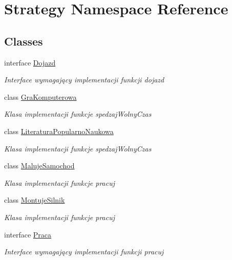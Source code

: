 \hypertarget{namespace_strategy}{}\section{Strategy Namespace Reference}
\label{namespace_strategy}
\subsection*{Classes}
\begin{DoxyCompactItemize}
\item 
interface \hyperlink{interface_strategy_1_1_dojazd}{Dojazd}
\begin{DoxyCompactList}\small\item\em Interface wymagający implementacji funkcji dojazd \end{DoxyCompactList}\item 
class \hyperlink{class_strategy_1_1_gra_komputerowa}{Gra\+Komputerowa}
\begin{DoxyCompactList}\small\item\em Klasa implementacji funkcje spedzaj\+Wolny\+Czas \end{DoxyCompactList}\item 
class \hyperlink{class_strategy_1_1_literatura_popularno_naukowa}{Literatura\+Popularno\+Naukowa}
\begin{DoxyCompactList}\small\item\em Klasa implementacji funkcje spedzaj\+Wolny\+Czas \end{DoxyCompactList}\item 
class \hyperlink{class_strategy_1_1_maluje_samochod}{Maluje\+Samochod}
\begin{DoxyCompactList}\small\item\em Klasa implementacji funkcje pracuj \end{DoxyCompactList}\item 
class \hyperlink{class_strategy_1_1_montuje_silnik}{Montuje\+Silnik}
\begin{DoxyCompactList}\small\item\em Klasa implementacji funkcje pracuj \end{DoxyCompactList}\item 
interface \hyperlink{interface_strategy_1_1_praca}{Praca}
\begin{DoxyCompactList}\small\item\em Interface wymagający implementacji funkcji pracuj \end{DoxyCompactList}\item 

\end{DoxyCompactItemize}
